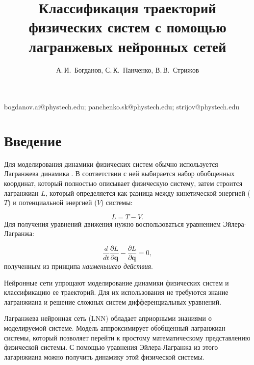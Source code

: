 \documentclass[12pt, twoside]{article}
\begin{document}
\title
    {Классификация траекторий физических систем с помощью лагранжевых нейронных сетей}
\author
    {А.\,И.~Богданов, С.\,К.~Панченко, В.\,В.~Стрижов} 
\email
    {bogdanov.ai@phystech.edu; panchenko.sk@phystech.edu; strijov@phystech.edu}

\maketitle

\section{Введение}
 
    Для моделирования динамики физических систем обычно используется Лагранжева динамика \cite{landau1976mechanics}. В соответствии с ней выбирается набор обобщенных координат, который полностью описывает физическую систему, затем строится лагранжиан $L$, который определяется как разница между кинетической энергией ($T$) и потенциальной энергией ($V$) системы:

    $$L = T - V.$$
    Для получения уравнений движения нужно воспользоваться уравнением Эйлера-Лагранжа:

    $$\frac{d}{dt} \frac{\partial L}{\partial \dot{\mathbf{q}}} - \frac{\partial L}{\partial \mathbf{q}} = 0,$$
    полученным из принципа \emph{наименьшего действия}.

    Нейронные сети упрощают моделирование динамики физических систем и классификацию ее траекторий. Для их использования не требуются знание лагранжиана и решение сложных систем дифференциальных уравнений. 
    
    Лагранжева нейронная сеть (LNN) \cite{cranmer2020lagrangian} обладает априорными знаниями о моделируемой системе. Модель аппроксимирует обобщенный лагранжиан системы, который позволяет перейти к простому математическому представлению физической системы. С помощью уравнения Эйлера-Лагранжа из этого лагарнжиана можно получить динамику этой физической системы.
\end{document}
